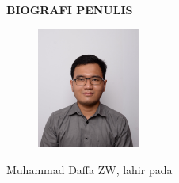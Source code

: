 \begin{center}
  \Large
  \textbf{BIOGRAFI PENULIS}
\end{center}


\vspace{2ex}

\begin{figure}
  \centering
  \vspace{-3ex}
  \includegraphics[width=0.3\textwidth]{gambar/bener/Foto Muhammad Daffa Z3.JPG}
  \vspace{-4ex}
\end{figure}

Muhammad Daffa ZW, lahir pada \lipsum[1]

\lipsum[2]